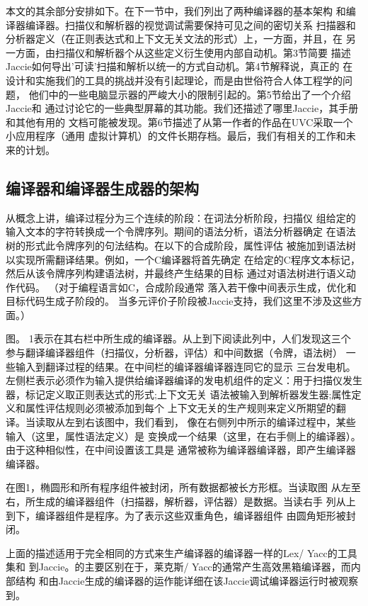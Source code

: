 本文的其余部分安排如下。在下一节中，我们列出了两种编译器的基本架构
和编译器编译器。扫描仪和解析器的视觉调试需要保持可见之间的密切关系
扫描器和分析器定义（在正则表达式和上下文无关文法的形式）上，一方面，并​​且，在
另一方面，由扫描仪和解析器个从这些定义衍生使用内部自动机。第3节简要
描述Jaccie如何导​​出'可读'扫描和解析以统一的方式自动机。第4节解释说，真正的
在设计和实施我们的工具的挑战并没有引起理论，而是由世俗符合人体工程学的问题，
他们中的一些电脑显示器的严峻大小的限制引起的。第5节给出了一个介绍Jaccie和
通过讨论它的一些典型屏幕的其功能。我们还描述了哪里Jaccie，其手册和其他有用的
文档可能被发现。第6节描述了从第一作者的作品在UVC采取一个小应用程序（通用
虚拟计算机）的文件长期存档。最后，我们有相关的工作和未来的计划。
\subsection{编译器和编译器生成器的架构}
从概念上讲，编译过程分为三个连续的阶段：在词法分析阶段，扫描仪
组给定的输入文本的字符转换成一个令牌序列。期间的语法分析，语法分析器确定
在语法树的形式此令牌序列的句法结构。在以下的合成阶段，属性评估
被施加到语法树以实现所需翻译结果。例如，一个C编译器将首先确定
在给定的C程序文本标记，然后从该令牌序列构建语法树，并最终产生结果的目标
通过对语法树进行语义动作代码。 （对于编程语言如C，合成阶段通常
落入若干像中间表示生成，优化和目标代码生成子阶段的。
当多元评价子阶段被Jaccie支持，我们这里不涉及这些方面。）

图。 1表示在其右栏中所生成的编译器。从上到下阅读此列中，人们发现这三个
参与翻译编译器组件（扫描仪，分析器，评估）和中间数据（令牌，语法树）
一些输入到翻译过程的结果。在中间栏的编译器编译器连同它的显示
三台发电机。左侧栏表示必须作为输入提供给编译器编译的发电机组件的定义：用于扫描仪发生器，标记定义取正则表达式的形式;上下文无关
语法被输入到解析器发生器;属性定义和属性评估规则必须被添加到每个
上下文无关的生产规则来定义所期望的翻译。当读取从左到右该图中，我们看到，
像在右侧列中所示的编译过程中，某些输入（这里，属性语法定义）是
变换成一个结果（这里，在右手侧上的编译器）。由于这种相似性，在中间设置该工具是
通常被称为编译器编译器，即产生编译器编译器。

在图1，椭圆形和所有程序组件被封闭，所有数据都被长方形框。当读取图
从左至右，所生成的编译器组件（扫描器，解析器，评估器）是数据。当读右手
列从上到下，编译器组件是程序。为了表示这些双重角色，编译器组件
由圆角矩形被封闭。


上面的描述适用于完全相同的方式来生产编译器的编译器一样的Lex/ Yacc的工具集和
到Jaccie。的主要区别在于，莱克斯/ Yacc的通常产生高效黑箱编译器，而内部结构
和由Jaccie生成的编译器的运作能详细在该Jaccie调试编译器运行时被观察到。

